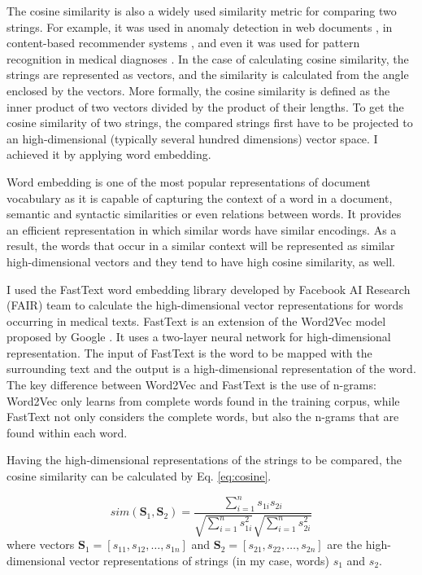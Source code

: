 The cosine similarity is also a widely used similarity metric for comparing two strings. For example, it was used in anomaly detection in web documents \cite{friedman2007anomaly}, in content-based recommender systems \cite{zenebe2009representation}, and even it was used for pattern recognition in medical diagnoses \cite{ye2011cosine}. In the case of calculating cosine similarity, the strings are represented as vectors, and the similarity is calculated from the angle enclosed by the vectors. More formally, the cosine similarity is defined as the inner product of two vectors divided by the product of their lengths. To get the cosine similarity of two strings, the compared strings first have to be projected to an high-dimensional (typically several hundred dimensions) vector space. I achieved it by applying word embedding.

Word embedding \cite{mikolov2013distributed} is one of the most popular representations of document vocabulary as it is capable of capturing the context of a word in a document, semantic and syntactic similarities or even relations between words. It provides an efficient representation in which similar words have similar encodings. As a result, the words that occur in a similar context will be represented as similar high-dimensional vectors and they tend to have high cosine similarity, as well.

I used the FastText word embedding library developed by Facebook AI Research (FAIR) team to calculate the high-dimensional vector representations for words occurring in medical texts. FastText is an extension of the Word2Vec model proposed by Google \cite{mikolov2013distributed}. It uses a two-layer neural network for high-dimensional representation. The input of FastText is the word to be mapped with the surrounding text and the output is a high-dimensional representation of the word. The key difference between Word2Vec and FastText is the use of n-grams: Word2Vec only learns from complete words found in the training corpus, while FastText not only considers the complete words, but also the n-grams that are found within each word.

Having the high-dimensional representations of the strings to be compared, the cosine similarity can be calculated by Eq. \ref{eq:cosine}.

\begin{equation}
	sim(\textbf{S}_1,\textbf{S}_2)=\frac{\sum_{i=1}^{n}s_{1i} s_{2i}}{\sqrt{\sum_{i=1}^{n}s_{1i}^2}\sqrt{\sum_{i=1}^{n}s_{2i}^2}}
	\label{eq:cosine}
\end{equation}
where vectors $\textbf{S}_1=[s_{11},s_{12},\dots,s_{1n}]$ and $\textbf{S}_2=[s_{21},s_{22},\dots,s_{2n}]$ are the high-dimensional vector representations of strings (in my case, words) $s_1$ and $s_2$. 


